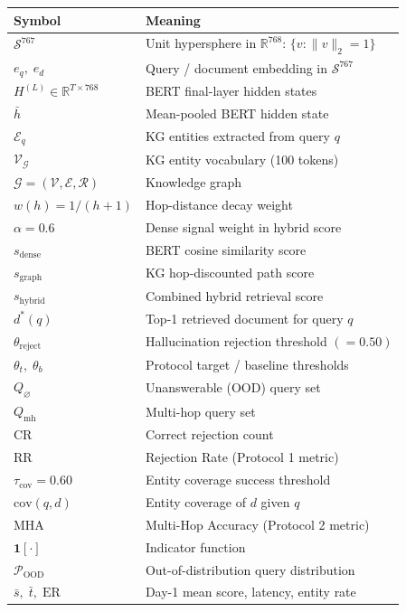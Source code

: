 \documentclass[12pt,a4paper]{article}
\theoremstyle{definition}
\theoremstyle{plain}
\theoremstyle{remark}
\newcommand{\R}{\mathbb{R}}
\begin{document}
\begin{center}
\renewcommand{\arraystretch}{1.35}
\begin{tabular}{ll}
\toprule
\textbf{Symbol} & \textbf{Meaning} \\
\midrule
$\mathcal{S}^{767}$        & Unit hypersphere in $\R^{768}$: $\{v:\|v\|_2=1\}$ \\
$e_q,\; e_d$               & Query / document embedding in $\mathcal{S}^{767}$ \\
$H^{(L)} \in \R^{T\times768}$ & BERT final-layer hidden states \\
$\bar{h}$                  & Mean-pooled BERT hidden state \\
$\mathcal{E}_q$            & KG entities extracted from query $q$ \\
$\mathcal{V}_\mathcal{G}$  & KG entity vocabulary (100 tokens) \\
$\mathcal{G}=(\mathcal{V},\mathcal{E},\mathcal{R})$ & Knowledge graph \\
$w(h)=1/(h+1)$             & Hop-distance decay weight \\
$\alpha = 0.6$             & Dense signal weight in hybrid score \\
$s_{\text{dense}}$         & BERT cosine similarity score \\
$s_{\text{graph}}$         & KG hop-discounted path score \\
$s_{\text{hybrid}}$        & Combined hybrid retrieval score \\
$d^*(q)$                   & Top-1 retrieved document for query $q$ \\
$\theta_{\text{reject}}$   & Hallucination rejection threshold $(=0.50)$ \\
$\theta_t,\; \theta_b$     & Protocol target / baseline thresholds \\
$Q_\varnothing$            & Unanswerable (OOD) query set \\
$Q_{\text{mh}}$            & Multi-hop query set \\
$\mathrm{CR}$              & Correct rejection count \\
$\mathrm{RR}$              & Rejection Rate (Protocol 1 metric) \\
$\tau_{\text{cov}}=0.60$   & Entity coverage success threshold \\
$\mathrm{cov}(q,d)$        & Entity coverage of $d$ given $q$ \\
$\mathrm{MHA}$             & Multi-Hop Accuracy (Protocol 2 metric) \\
$\mathbf{1}[\cdot]$        & Indicator function \\
$\mathcal{P}_\text{OOD}$   & Out-of-distribution query distribution \\
$\bar{s},\;\bar{t},\;\mathrm{ER}$ & Day-1 mean score, latency, entity rate \\
\bottomrule
\end{tabular}
\end{center}
\end{document}
